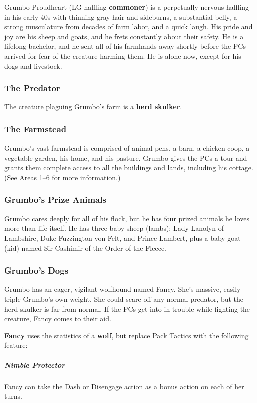 \documentclass[10pt,a4paper,twoside,bg=print,twocolumn,openany,nodeprecatedcode]{dndbook}
\begin{document}
Grumbo Proudheart (LG halfling \textbf{commoner}) is a perpetually nervous halfling in his early 40s with thinning gray hair and sideburns, a substantial belly, a strong musculature from decades of farm labor, and a quick laugh. His pride and joy are his sheep and goats, and he frets constantly about their safety. He is a lifelong bachelor, and he sent all of his farmhands away shortly before the PCs arrived for fear of the creature harming them. He is alone now, except for his dogs and livestock.

\subsubsection{The Predator}
The creature plaguing Grumbo's farm is a \textbf{herd skulker}.

\subsubsection{The Farmstead}
Grumbo's vast farmstead is comprised of animal pens, a barn, a chicken coop, a vegetable garden, his home, and his pasture. Grumbo gives the PCs a tour and grants them complete access to all the buildings and lands, including his cottage. (See Areas 1–6 for more information.)

\subsubsection{Grumbo's Prize Animals}
Grumbo cares deeply for all of his flock, but he has four prized animals he loves more than life itself. He has three baby sheep (lambs): Lady Lanolyn of Lambshire, Duke Fuzzington von Felt, and Prince Lambert, plus a baby goat (kid) named Sir Cashimir of the Order of the Fleece.

\subsubsection{Grumbo's Dogs}
Grumbo has an eager, vigilant wolfhound named Fancy. She's massive, easily triple Grumbo's own weight. She could scare off any normal predator, but the herd skulker is far from normal. If the PCs get into in trouble while fighting the creature, Fancy comes to their aid.

\textbf{Fancy} uses the statistics of a \textbf{wolf}, but replace Pack Tactics with the following feature:

\subparagraph{Nimble Protector}
Fancy can take the Dash or Disengage action as a bonus action on each of her turns.
\end{document}
